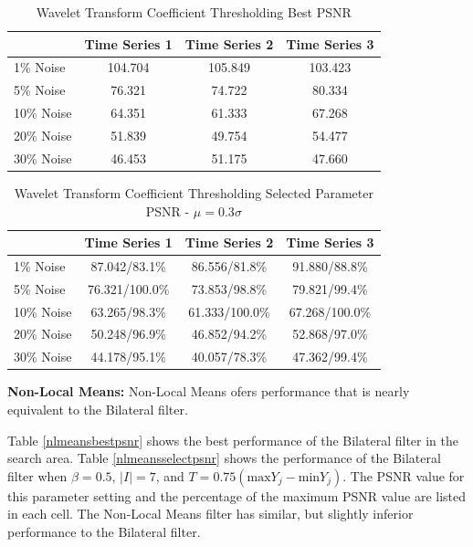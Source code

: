 \documentclass[11pt]{article}
\newcommand{\vs}{\vspace{0.1in}}
\theoremstyle{definition}
\begin{document}
\begin{table}[!h]
\small
\begin{center}
\begin{tabular}{l | c | c | c}
 & Time Series 1 & Time Series 2 & Time Series 3 \\ \hline
1\% Noise & 104.704 & 105.849 & 103.423 \\ \hline
5\% Noise & 76.321 & 74.722 & 80.334 \\ \hline
10\% Noise & 64.351 & 61.333 & 67.268 \\ \hline
20\% Noise & 51.839 & 49.754 & 54.477 \\ \hline
30\% Noise & 46.453 & 51.175 & 47.660
\end{tabular}
\caption{Wavelet Transform Coefficient Thresholding Best PSNR}
\label{waveletbestpsnr}
\end{center}
\end{table}

\begin{table}[!h]
\small
\begin{center}
\begin{tabular}{l | c | c | c}
 & Time Series 1 & Time Series 2 & Time Series 3 \\ \hline
1\% Noise & 87.042/83.1\% & 86.556/81.8\% & 91.880/88.8\% \\ \hline
5\% Noise & 76.321/100.0\% & 73.853/98.8\% & 79.821/99.4\% \\ \hline
10\% Noise & 63.265/98.3\% & 61.333/100.0\% & 67.268/100.0\% \\ \hline
20\% Noise & 50.248/96.9\% & 46.852/94.2\% & 52.868/97.0\% \\ \hline
30\% Noise & 44.178/95.1\% & 40.057/78.3\% & 47.362/99.4\%
\end{tabular}
\caption{Wavelet Transform Coefficient Thresholding Selected Parameter PSNR - $\mu = 0.3 \sigma$}
\label{waveletselectpsnr}
\end{center}
\end{table}

\vs
\noindent
\textbf{Non-Local Means:} Non-Local Means ofers performance that is nearly equivalent to the Bilateral filter.

Table \ref{nlmeansbestpsnr} shows the best performance of the Bilateral filter in the search area. Table \ref{nlmeansselectpsnr} shows the performance of the Bilateral filter when $\beta = 0.5$, $\lvert I \rvert = 7$, and $T = 0.75 \left( \mathrm{max} Y_j - \mathrm{min} Y_j \right)$. The PSNR value for this parameter setting and the percentage of the maximum PSNR value are listed in each cell. The Non-Local Means filter has similar, but slightly inferior performance to the Bilateral filter.
\end{document}
